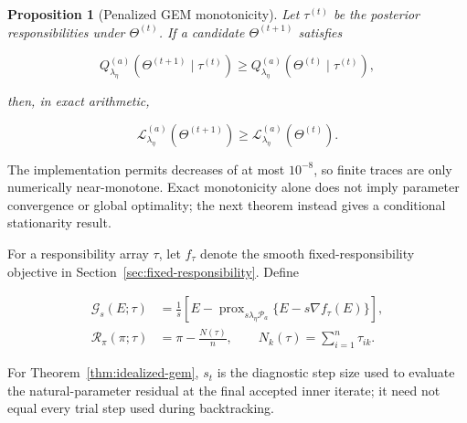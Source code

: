 \documentclass[preprint,12pt,authoryear]{elsarticle}
\newtheorem{proposition}{Proposition}
\begin{document}
\begin{proposition}[Penalized GEM monotonicity]
\label{prop:gem-monotonicity}
Let $\tau^{(t)}$ be the posterior responsibilities under $\Theta^{(t)}$. If a
candidate $\Theta^{(t+1)}$ satisfies

\[
Q_{\lambda_\eta}^{(a)}(\Theta^{(t+1)}\mid\tau^{(t)})
\geq
Q_{\lambda_\eta}^{(a)}(\Theta^{(t)}\mid\tau^{(t)}),
\]

then, in exact arithmetic,

\[
\mathcal L_{\lambda_\eta}^{(a)}(\Theta^{(t+1)})
\geq
\mathcal L_{\lambda_\eta}^{(a)}(\Theta^{(t)}).
\]
\end{proposition}

The implementation permits decreases of at most $10^{-8}$, so finite traces
are only numerically near-monotone. Exact monotonicity alone does not imply
parameter convergence or global optimality; the next theorem instead gives a
conditional stationarity result.

For a responsibility array $\tau$, let $f_\tau$ denote the smooth
fixed-responsibility objective in Section~\ref{sec:fixed-responsibility}. Define

\begin{equation}
\label{eq:block-residual-definitions}
\begin{aligned}
\mathcal G_s(E;\tau)
&=\frac{1}{s}
\left[
E-\operatorname{prox}_{s\lambda_\eta\mathcal P_a}
\{E-s\nabla f_\tau(E)\}
\right],\\
\mathcal R_\pi(\pi;\tau)
&=\pi-\frac{N(\tau)}{n},
\qquad
N_k(\tau)=\sum_{i=1}^n\tau_{ik}.
\end{aligned}
\end{equation}

For Theorem~\ref{thm:idealized-gem}, $s_t$ is the diagnostic step size used to
evaluate the natural-parameter residual at the final accepted inner iterate;
it need not equal every trial step used during backtracking.
\end{document}
